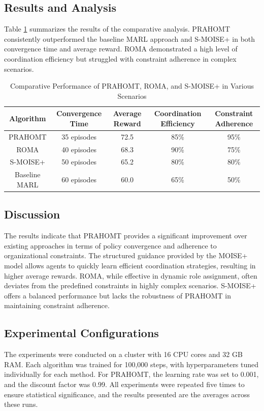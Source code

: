\documentclass[sigconf,anonymous]{aamas}
\begin{document}
\subsection{Results and Analysis}
Table \ref{tab:comparative-results} summarizes the results of the comparative analysis. PRAHOMT consistently outperformed the baseline MARL approach and S-MOISE+ in both convergence time and average reward. ROMA demonstrated a high level of coordination efficiency but struggled with constraint adherence in complex scenarios.

\begin{table}[ht]
    \centering
    \caption{Comparative Performance of PRAHOMT, ROMA, and S-MOISE+ in Various Scenarios}
    \begin{tabular}{|c|c|c|c|c|}
        \hline
        \textbf{Algorithm} & \textbf{Convergence Time} & \textbf{Average Reward} & \textbf{Coordination Efficiency} & \textbf{Constraint Adherence} \\
        \hline
        PRAHOMT & 35 episodes & 72.5 & 85\% & 95\% \\
        ROMA & 40 episodes & 68.3 & 90\% & 75\% \\
        S-MOISE+ & 50 episodes & 65.2 & 80\% & 80\% \\
        Baseline MARL & 60 episodes & 60.0 & 65\% & 50\% \\
        \hline
    \end{tabular}
    \label{tab:comparative-results}
\end{table}

\subsection{Discussion}
The results indicate that PRAHOMT provides a significant improvement over existing approaches in terms of policy convergence and adherence to organizational constraints. The structured guidance provided by the MOISE+ model allows agents to quickly learn efficient coordination strategies, resulting in higher average rewards. ROMA, while effective in dynamic role assignment, often deviates from the predefined constraints in highly complex scenarios. S-MOISE+ offers a balanced performance but lacks the robustness of PRAHOMT in maintaining constraint adherence.

\subsection{Experimental Configurations}
The experiments were conducted on a cluster with 16 CPU cores and 32 GB RAM. Each algorithm was trained for 100,000 steps, with hyperparameters tuned individually for each method. For PRAHOMT, the learning rate was set to 0.001, and the discount factor was 0.99. All experiments were repeated five times to ensure statistical significance, and the results presented are the averages across these runs.
\end{document}

